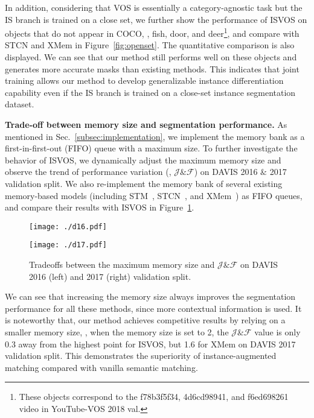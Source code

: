 \documentclass[10pt,twocolumn,letterpaper]{article}
\newcommand{\system}{ISVOS\xspace}
\begin{document}
In addition, considering that VOS is essentially a category-agnostic task but the IS branch is trained on a close set, we further show the performance of \system on objects that do not appear in COCO, \eg, fish, door, and deer\footnote{These objects correspond to the f78b3f5f34, 4d6cd98941, and f6ed698261 video in YouTube-VOS 2018 val.}, and compare with STCN and XMem in Figure~\ref{fig:openset}. The quantitative comparison is also displayed. We can see that our method still performs well on these objects and generates more accurate masks than existing methods. This indicates that joint training allows our method to develop generalizable instance differentiation capability even if the IS branch is trained on a close-set instance segmentation dataset.

\vspace{0.05in}
\noindent \textbf{Trade-off between memory size and segmentation performance.} As mentioned in Sec.~\ref{subsec:implementation}, we implement the memory bank as a first-in-first-out (FIFO) queue with a maximum size. To further investigate the behavior of \system, we dynamically adjust the maximum memory size and observe the trend of performance variation (\ie, $\mathcal{J\&F}$) on DAVIS 2016 $\&$ 2017 validation split. We also re-implement the memory bank of several existing memory-based models (including STM~\cite{oh2019video}, STCN~\cite{cheng2021stcn}, and XMem~\cite{cheng2022xmem}) as FIFO queues, and compare their results with \system in Figure~\ref{fig:tradeoffs}.

\begin{figure}[!ht]
\begin{minipage}[t]{0.49\linewidth}
\centering
\texttt{[image: ./d16.pdf]}
\end{minipage}
\begin{minipage}[t]{0.49\linewidth}
\centering
\texttt{[image: ./d17.pdf]}
\end{minipage}
\vspace{-0.1in}
\caption{Tradeoffs between the maximum memory size and $\mathcal{J\&F}$ on DAVIS 2016 (left) and 2017 (right) validation split.}
\label{fig:tradeoffs}
\end{figure}

We can see that increasing the memory size always improves the segmentation performance for all these methods,  since more contextual information is used. It is noteworthy that, our method achieves competitive results by relying on a smaller memory size, \eg, when the memory size is set to 2, the $\mathcal{J\&F}$ value is only 0.3 away from the highest point for \system, but 1.6 for XMem on DAVIS 2017 validation split. This demonstrates the superiority of instance-augmented matching compared with vanilla semantic matching.
\end{document}
